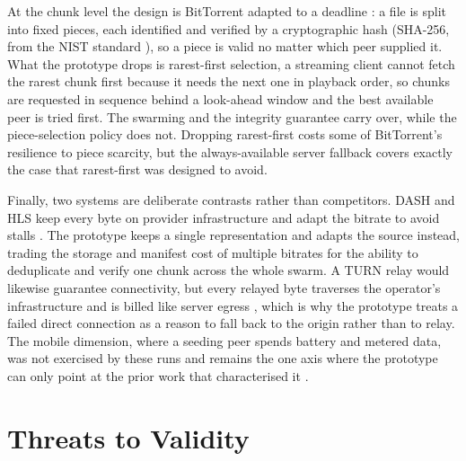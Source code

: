 \par At the chunk level the design is BitTorrent adapted to a deadline \cite{bittorent}: a file is split into fixed pieces, each identified and verified by a cryptographic hash (SHA-256, from the NIST standard \cite{secure_hash_standard}), so a piece is valid no matter which peer supplied it. What the prototype drops is rarest-first selection, a streaming client cannot fetch the rarest chunk first because it needs the next one in playback order, so chunks are requested in sequence behind a look-ahead window and the best available peer is tried first. The swarming and the integrity guarantee carry over, while the piece-selection policy does not. Dropping rarest-first costs some of BitTorrent's resilience to piece scarcity, but the always-available server fallback covers exactly the case that rarest-first was designed to avoid.

\par Finally, two systems are deliberate contrasts rather than competitors. DASH and HLS keep every byte on provider infrastructure and adapt the bitrate to avoid stalls \cite{standards_streaming_http,hls_rfc8216}. The prototype keeps a single representation and adapts the source instead, trading the storage and manifest cost of multiple bitrates for the ability to deduplicate and verify one chunk across the whole swarm. A TURN relay would likewise guarantee connectivity, but every relayed byte traverses the operator's infrastructure and is billed like server egress \cite{relays_turn}, which is why the prototype treats a failed direct connection as a reason to fall back to the origin rather than to relay. The mobile dimension, where a seeding peer spends battery and metered data, was not exercised by these runs and remains the one axis where the prototype can only point at the prior work that characterised it \cite{spotify_mobile_p2p,d2d_survey}.

\section{Threats to Validity}
\label{sec:eval-threats}

